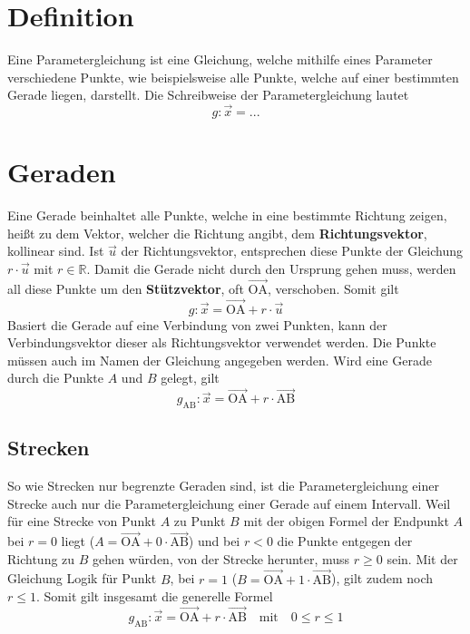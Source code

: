 \documentclass{article}
\begin{document}
 
\newcommand{\vect}[1]{\overrightarrow{#1}}
 
\section{Definition}
Eine Parametergleichung ist eine Gleichung, welche mithilfe eines Parameter verschiedene Punkte, wie beispielsweise alle Punkte, welche auf einer bestimmten Gerade liegen, darstellt. \newline
Die Schreibweise der Parametergleichung lautet 
\[
 g: \vect{x} = ...
\] 
  
\section{Geraden}
Eine Gerade beinhaltet alle Punkte, welche in eine bestimmte Richtung zeigen, heißt zu dem Vektor, welcher die Richtung angibt, dem \textbf{Richtungsvektor}, kollinear sind. Ist $\vect{u}$ der Richtungsvektor, entsprechen diese Punkte der Gleichung $r \cdot \vect{u}$ mit $r \in \mathbb{R}$. Damit die Gerade nicht durch den Ursprung gehen muss, werden all diese Punkte um den \textbf{Stützvektor}, oft $\vect{\mathrm{OA}}$, verschoben.
Somit gilt 
\[
 g: \vect{x} = \vect{\mathrm{OA}} + r \cdot \vect{u} 
\] 
Basiert die Gerade auf eine Verbindung von zwei Punkten, kann der Verbindungsvektor dieser als Richtungsvektor verwendet werden. Die Punkte müssen auch im Namen der Gleichung angegeben werden. Wird eine Gerade durch die Punkte $A$ und $B$ gelegt, gilt 
\[
 g_{\mathrm{AB}}: \vect{x} = \vect{\mathrm{OA}} + r \cdot \vect{\mathrm{AB}} 
\]
 
\subsection{Strecken}
So wie Strecken nur begrenzte Geraden sind, ist die Parametergleichung einer Strecke auch nur die Parametergleichung einer Gerade auf einem Intervall. Weil für eine Strecke von Punkt $A$ zu Punkt $B$ mit der obigen Formel der Endpunkt $A$ bei $r=0$ liegt ($A = \vect{\mathrm{OA}} + 0 \cdot \vect{\mathrm{AB}}$) und bei $r < 0$ die Punkte entgegen der Richtung zu $B$ gehen würden, von der Strecke herunter, muss $r \geq 0$ sein. Mit der Gleichung Logik für Punkt $B$, bei $r=1$ ($B = \vect{\mathrm{OA}} + 1 \cdot \vect{\mathrm{AB}}$), gilt zudem noch $r \leq 1$. Somit gilt insgesamt die generelle Formel 
\[
 g_{\mathrm{AB}}: \vect{x} = \vect{\mathrm{OA}} + r \cdot \vect{\mathrm{AB}}
 \quad \text{mit} \quad
 0 \leq r \leq 1 
\]
 
\end{document}
